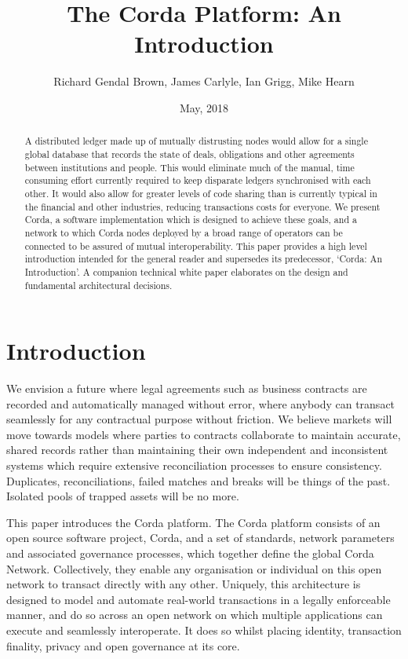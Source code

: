 \documentclass{article}
\author{Richard Gendal Brown, James Carlyle, Ian Grigg, Mike Hearn}
\date{May, 2018}
\title{The Corda Platform: An Introduction}
\begin{document}
\maketitle 

\begin{abstract}

A distributed ledger made up of mutually distrusting nodes would allow for a single global database that records the state of deals, obligations and other agreements between institutions and people. This would eliminate much of the manual, time consuming effort currently required to keep disparate ledgers synchronised with each other. It would also allow for greater levels of code sharing than is currently typical in the financial and other industries, reducing transactions costs for everyone. We present Corda, a software implementation which is designed to achieve these goals, and a network to which Corda nodes deployed by a broad range of operators can be connected to be assured of mutual interoperability. This paper provides a high level introduction intended for the general reader and supersedes its predecessor, `Corda: An Introduction'\cite{CordaIntro}. A companion technical white paper\cite{CordaTech} elaborates on the design and fundamental architectural decisions.
\end{abstract}
\newpage
\tableofcontents
\newpage
\section{Introduction}
We envision a future where legal agreements such as business contracts are recorded and automatically managed without error, where anybody can transact seamlessly for any contractual purpose without friction. We believe markets will move towards models where parties to contracts collaborate to maintain accurate, shared records rather than maintaining their own independent and inconsistent systems which require extensive reconciliation processes to ensure consistency. Duplicates, reconciliations, failed matches and breaks will be things of the past. Isolated pools of trapped assets will be no more.

This paper introduces the Corda platform. The Corda platform consists of an open source software project, Corda, and a set of standards, network parameters and associated governance processes, which together define the global Corda Network. Collectively, they enable any organisation or individual on this open network to transact directly with any other. Uniquely, this architecture is designed to model and automate real-world transactions in a legally enforceable manner, and do so across an open network on which multiple applications can execute and seamlessly interoperate. It does so whilst placing identity, transaction finality, privacy and open governance at its core.
\end{document}
